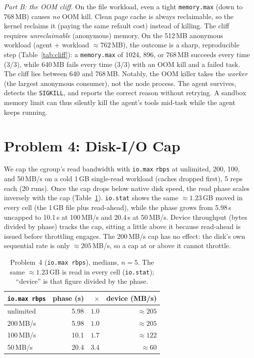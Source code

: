 \documentclass[10pt,twocolumn]{article}
\newcommand{\uu}[1]{\,\textsf{#1}}
\begin{document}
\emph{Part B: the OOM cliff.} On the file workload, even a tight
\texttt{memory.max} (down to 768\,MB) causes \emph{no} OOM kill. Clean page
cache is always reclaimable, so the kernel reclaims it (paying the same
refault cost) instead of killing. The cliff requires \emph{unreclaimable}
(anonymous) memory. On the 512\,MB anonymous workload (agent + workload
${\approx}762$\,MB), the outcome is a sharp, reproducible step
(Table~\ref{tab:cliff}): a \texttt{memory.max} of 1024, 896, or 768\,MB
succeeds every time (3/3), while 640\,MB fails every time (3/3) with an OOM
kill and a failed task. The cliff lies between 640 and 768\,MB. Notably, the
OOM killer takes the \emph{worker} (the largest anonymous consumer), not the
node process. The agent survives, detects the \texttt{SIGKILL}, and reports
the correct reason without retrying. A sandbox memory limit can thus
silently kill the agent's tools mid-task while the agent keeps running.

\section{Problem 4: Disk-I/O Cap}
\label{sec:io}

We cap the cgroup's read bandwidth with \texttt{io.max} \texttt{rbps} at
unlimited, 200, 100, and 50\uu{MB/s} on a cold 1\,GB single-read workload
(caches dropped first), 5 reps each (20 runs). Once the cap drops below
native disk speed, the read phase scales inversely with the cap
(Table~\ref{tab:io}). \texttt{io.stat} shows the same ${\approx}1.23$\,GB
moved in every cell (the 1\,GB file plus read-ahead), while the phase grows
from 5.98\uu{s} uncapped to 10.1\uu{s} at 100\uu{MB/s} and 20.4\uu{s} at
50\uu{MB/s}. Device throughput (bytes divided by phase) tracks the cap,
sitting a little above it because read-ahead is issued before throttling
engages. The 200\uu{MB/s} cap has no effect: the disk's own sequential rate
is only ${\approx}205$\uu{MB/s}, so a cap at or above it cannot throttle.

\begin{table}[t]\centering\footnotesize
\setlength{\tabcolsep}{4pt}
\caption{Problem~4 (\texttt{io.max rbps}), medians, $n{=}5$. The same
${\approx}1.23$\,GB is read in every cell (\texttt{io.stat}); ``device''
is that figure divided by the phase.}
\label{tab:io}
\begin{tabular}{@{}lrrr@{}}
\toprule
\texttt{io.max rbps} & phase (s) & $\times$ & device (MB/s)\\
\midrule
unlimited    & 5.98 & $1.0$ & ${\approx}205$ \\
200\uu{MB/s} & 5.98 & $1.0$ & ${\approx}205$ \\
100\uu{MB/s} & 10.1 & $1.7$ & ${\approx}122$ \\
50\uu{MB/s}  & 20.4 & $3.4$ & ${\approx}60$ \\
\bottomrule
\end{tabular}
\end{table}
\end{document}
